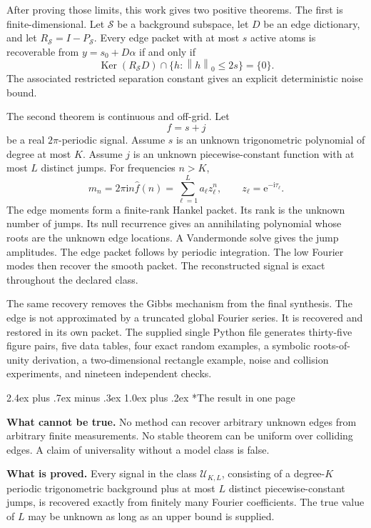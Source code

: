 \documentclass[11pt,oneside]{book}
\makeatletter
\renewcommand\chapter{\@startsection{chapter}{0}{\z@}%
  {2.4ex plus .7ex minus .3ex}%
  {1.0ex plus .2ex}%
  {\normalfont\LARGE\bfseries\color{Ink}}}
\theoremstyle{remark}
\newcommand{\Ker}{\operatorname{Ker}}
\newcommand{\norm}[1]{\left\lVert #1\right\rVert}
\newcommand{\e}{\mathrm e}
\newcommand{\ii}{\mathrm i}
\newcommand{\RS}{R_{\mathcal S}}
\newcommand{\PS}{P_{\mathcal S}}
\newcommand{\EdgeClass}{\mathcal U_{K,L}}
\newcommand{\StatusBox}[2]{%
\begin{center}
\colorbox{#1}{\parbox{0.93\linewidth}{\vspace{5pt}\small #2\vspace{5pt}}}
\end{center}}
\makeatother
\begin{document}
After proving those limits, this work gives two positive theorems. The first is finite-dimensional. Let \(\mathcal S\) be a background subspace, let \(D\) be an edge dictionary, and let \(\RS=I-\PS\). Every edge packet with at most \(s\) active atoms is recoverable from \(y=s_0+D\alpha\) if and only if
\[
\Ker(\RS D)\cap\{h:\norm{h}_0\le 2s\}=\{0\}.
\]
The associated restricted separation constant gives an explicit deterministic noise bound.

The second theorem is continuous and off-grid. Let
\[
f=s+j
\]
be a real \(2\pi\)-periodic signal. Assume \(s\) is an unknown trigonometric polynomial of degree at most \(K\). Assume \(j\) is an unknown piecewise-constant function with at most \(L\) distinct jumps. For frequencies \(n>K\),
\[
m_n=2\pi\ii n\widehat f(n)
=\sum_{\ell=1}^{L}a_\ell z_\ell^n,
\qquad
z_\ell=\e^{-\ii\tau_\ell}.
\]
The edge moments form a finite-rank Hankel packet. Its rank is the unknown number of jumps. Its null recurrence gives an annihilating polynomial whose roots are the unknown edge locations. A Vandermonde solve gives the jump amplitudes. The edge packet follows by periodic integration. The low Fourier modes then recover the smooth packet. The reconstructed signal is exact throughout the declared class.

The same recovery removes the Gibbs mechanism from the final synthesis. The edge is not approximated by a truncated global Fourier series. It is recovered and restored in its own packet. The supplied single Python file generates thirty-five figure pairs, five data tables, four exact random examples, a symbolic roots-of-unity derivation, a two-dimensional rectangle example, noise and collision experiments, and nineteen independent checks.

\chapter*{The result in one page}
\StatusBox{PaleOrange}{\textbf{What cannot be true.} No method can recover arbitrary unknown edges from arbitrary finite measurements. No stable theorem can be uniform over colliding edges. A claim of universality without a model class is false.}

\StatusBox{PaleTeal}{\textbf{What is proved.} Every signal in the class \(\EdgeClass\), consisting of a degree-\(K\) periodic trigonometric background plus at most \(L\) distinct piecewise-constant jumps, is recovered exactly from finitely many Fourier coefficients. The true value of \(L\) may be unknown as long as an upper bound is supplied.}
\end{document}
